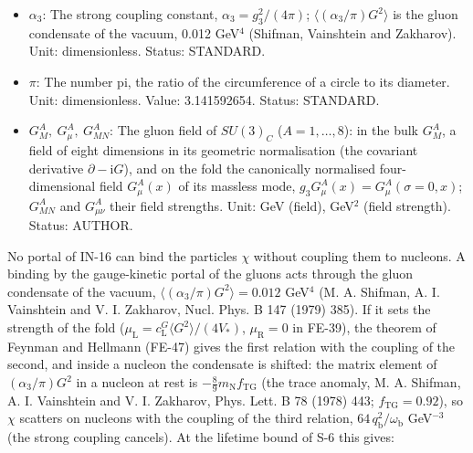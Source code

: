 \documentclass[
  10pt,
]{article}
\begin{document}
\begin{itemize}
  \(-\frac89m_{\mathrm{N}}f_{\mathrm{TG}}\). Unit: dimensionless. Value:
  0.92. Status: STANDARD.
\item
  \(\alpha_3\): The strong coupling constant,
  \(\alpha_3 = g_3^2/(4\pi)\); \(\langle(\alpha_3/\pi)G^2\rangle\) is
  the gluon condensate of the vacuum, 0.012 GeV\(^4\) (Shifman,
  Vainshtein and Zakharov). Unit: dimensionless. Status: STANDARD.
\item
  \(\pi\): The number pi, the ratio of the circumference of a circle to
  its diameter. Unit: dimensionless. Value: 3.141592654. Status:
  STANDARD.
\item
  \(G^A_M,\ G^A_\mu,\ G^A_{MN}\): The gluon field of \(SU(3)_C\)
  (\(A = 1, \dots, 8\)): in the bulk \(G^A_M\), a field of eight
  dimensions in its geometric normalisation (the covariant derivative
  \(\partial - \mathrm{i}G\)), and on the fold the canonically
  normalised four-dimensional field \(G^A_\mu(x)\) of its massless mode,
  \(g_3G^A_\mu(x) = G^A_\mu(\sigma = 0, x)\); \(G^A_{MN}\) and
  \(G^A_{\mu\nu}\) their field strengths. Unit: GeV (field), GeV\(^2\)
  (field strength). Status: AUTHOR.
\end{itemize}

No portal of IN-16 can bind the particles \(\chi\) without coupling them
to nucleons. A binding by the gauge-kinetic portal of the gluons acts
through the gluon condensate of the vacuum,
\(\langle(\alpha_3/\pi)G^2\rangle = 0.012\) GeV\(^4\) (M. A. Shifman, A.
I. Vainshtein and V. I. Zakharov, Nucl. Phys. B 147 (1979) 385). If it
sets the strength of the fold
(\(\mu_{\mathrm{L}} = c^{G}_{\mathrm{L}}\langle G^2\rangle/(4V_*)\),
\(\mu_{\mathrm{R}} = 0\) in FE-39), the theorem of Feynman and Hellmann
(FE-47) gives the first relation with the coupling of the second, and
inside a nucleon the condensate is shifted: the matrix element of
\((\alpha_3/\pi)G^2\) in a nucleon at rest is
\(-\frac89m_{\mathrm{N}}f_{\mathrm{TG}}\) (the trace anomaly, M. A.
Shifman, A. I. Vainshtein and V. I. Zakharov, Phys. Lett. B 78 (1978)
443; \(f_{\mathrm{TG}} = 0.92\)), so \(\chi\) scatters on nucleons with
the coupling of the third relation,
\(64\,q_{\mathrm{b}}^2/\omega_{\mathrm{b}}\) GeV\(^{-3}\) (the strong
coupling cancels). At the lifetime bound of S-6 this gives:
\end{document}
